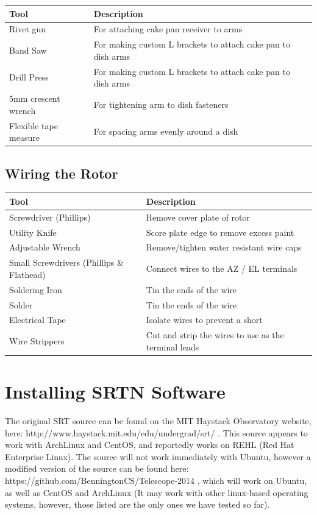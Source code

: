 \documentclass[11pt]{article} %
\begin{document}
\begin{tabular}{| l | p{10cm} |}
\hline
\textbf{Tool} & \textbf{Description} \\ \hline \hline
Rivet gun & For attaching cake pan receiver to arms \\ \hline
Band Saw & For making custom L brackets to attach cake pan to dish arms \\ \hline
Drill Press & For making custom L brackets to attach cake pan to dish arms \\ \hline
5mm crescent wrench & For tightening arm to dish fasteners \\ \hline
Flexible tape measure & For spacing arms evenly around a dish \\ \hline
\end{tabular}


\subsection{Wiring the Rotor}

\begin{tabular}{| l | l |}
\hline
\textbf{Tool} & \textbf{Description} \\ \hline \hline
Screwdriver (Phillips) & Remove cover plate of rotor \\ \hline
Utility Knife & Score plate edge to remove excess paint \\ \hline
Adjustable Wrench & Remove/tighten water resistant wire caps \\ \hline
Small Screwdrivers (Phillips \& Flathead) & Connect wires to the AZ / EL terminals \\ \hline
Soldering Iron & Tin the ends of the wire \\ \hline
Solder & Tin the ends of the wire \\ \hline
Electrical Tape & Isolate wires to prevent a short \\ \hline
Wire Strippers & Cut and strip the wires to use as the terminal leads \\ \hline
\end{tabular}



\newpage
\section{Installing SRTN Software}

The original SRT source can be found on the MIT Haystack Observatory website, here: http://www.haystack.mit.edu/edu/undergrad/srt/ . This source appears to work with ArchLinux and CentOS, and reportedly works on REHL (Red Hat Enterprise Linux). The source will not work immediately with Ubuntu, however a modified version of the source can be found here: https://github.com/BenningtonCS/Telescope-2014 , which will work on Ubuntu, as well as CentOS and ArchLinux (It may work with other linux-based operating systems, however, those listed are the only ones we have tested so far). 
\end{document}
